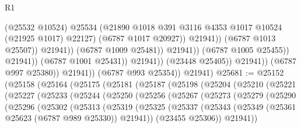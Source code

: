 \begin{lexlean}{R1}
\begin{coremodule}
                                                  (@25532 @10524)
                                                  @25534
                                                  (@21890
                                                    @1018
                                                    @391
                                                    @3116
                                                    @4353
                                                    @1017
                                                    @10524
                                                    (@21925 @1017)
                                                    @22127)
                                                  (@6787 @1017 @20927))
                                                @21941))
                                            (@6787 @1013 @25507))
                                          @21941))
                                      (@6787 @1009 @25481))
                                    @21941))
                                (@6787 @1005 @25455))
                              @21941))
                          (@6787 @1001 @25431))
                        @21941))
                    (@23448 @25405))
                  @21941))
              (@6787 @997 @25380))
            @21941))
        (@6787 @993 @25354))
      @21941)
@25681 := @25152
    (@25158
      (@25164
        (@25175
          (@25181
            (@25187
              (@25198
                (@25204
                  (@25210
                    (@25221
                      (@25227
                        (@25233
                          (@25244
                            (@25250
                              (@25256
                                (@25267
                                  (@25273
                                    (@25279
                                      (@25290
                                        (@25296
                                          (@25302
                                            (@25313
                                              (@25319
                                                (@25325
                                                  (@25337
                                                    (@25343
                                                      (@25349
                                                        (@25361 @25623 (@6787 @989 @25330))
                                                        @21941))
                                                    (@23455 @25306))
                                                  @21941))

\end{coremodule}
\end{lexlean}
